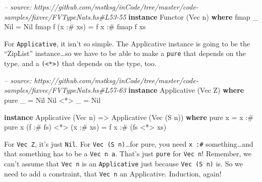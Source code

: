 \documentclass[]{article}
\newenvironment{Shaded}{}{}
\newcommand{\KeywordTok}[1]{\textcolor[rgb]{0.00,0.44,0.13}{\textbf{#1}}}
\newcommand{\DataTypeTok}[1]{\textcolor[rgb]{0.56,0.13,0.00}{#1}}
\newcommand{\CommentTok}[1]{\textcolor[rgb]{0.38,0.63,0.69}{\textit{#1}}}
\newcommand{\OtherTok}[1]{\textcolor[rgb]{0.00,0.44,0.13}{#1}}
\newcommand{\FunctionTok}[1]{\textcolor[rgb]{0.02,0.16,0.49}{#1}}
\newcommand{\NormalTok}[1]{#1}
\begin{document}
\begin{Shaded}
\begin{Highlighting}[]
\CommentTok{-- source: https://github.com/mstksg/inCode/tree/master/code-samples/fixvec/FVTypeNats.hs#L53-55}
\KeywordTok{instance} \DataTypeTok{Functor}\NormalTok{ (}\DataTypeTok{Vec}\NormalTok{ n) }\KeywordTok{where}
\NormalTok{    fmap _ }\DataTypeTok{Nil}       \FunctionTok{=} \DataTypeTok{Nil}
\NormalTok{    fmap f (x }\FunctionTok{:#}\NormalTok{ xs) }\FunctionTok{=}\NormalTok{ f x }\FunctionTok{:#}\NormalTok{ fmap f xs}
\end{Highlighting}
\end{Shaded}

For \texttt{Applicative}, it isn't so simple. The Applicative instance is going
to be the ``ZipList'' instance\ldots{}so we have to be able to make a
\texttt{pure} that depends on the type, and a
\texttt{(\textless{}*\textgreater{})} that depends on the type, too.

\begin{Shaded}
\begin{Highlighting}[]
\CommentTok{-- source: https://github.com/mstksg/inCode/tree/master/code-samples/fixvec/FVTypeNats.hs#L57-63}
\KeywordTok{instance} \DataTypeTok{Applicative}\NormalTok{ (}\DataTypeTok{Vec} \DataTypeTok{Z}\NormalTok{) }\KeywordTok{where}
\NormalTok{    pure _    }\FunctionTok{=} \DataTypeTok{Nil}
    \DataTypeTok{Nil} \FunctionTok{<*>}\NormalTok{ _ }\FunctionTok{=} \DataTypeTok{Nil}

\KeywordTok{instance} \DataTypeTok{Applicative}\NormalTok{ (}\DataTypeTok{Vec}\NormalTok{ n) }\OtherTok{=>} \DataTypeTok{Applicative}\NormalTok{ (}\DataTypeTok{Vec}\NormalTok{ (}\DataTypeTok{S}\NormalTok{ n)) }\KeywordTok{where}
\NormalTok{    pure x }\FunctionTok{=}\NormalTok{ x }\FunctionTok{:#}\NormalTok{ pure x}
\NormalTok{    (f }\FunctionTok{:#}\NormalTok{ fs) }\FunctionTok{<*>}\NormalTok{ (x }\FunctionTok{:#}\NormalTok{ xs) }\FunctionTok{=}\NormalTok{ f x }\FunctionTok{:#}\NormalTok{ (fs }\FunctionTok{<*>}\NormalTok{ xs)}
\end{Highlighting}
\end{Shaded}

For \texttt{Vec\ Z}, it's just \texttt{Nil}. For \texttt{Vec\ (S\ n)}\ldots{}for
pure, you need \texttt{x\ :\#} something\ldots{}and that something has to be a
\texttt{Vec\ n\ a}. That's just \texttt{pure} for \texttt{Vec\ n}! Remember, we
can't assume that \texttt{Vec\ n} is an \texttt{Applicative} just because
\texttt{Vec\ (S\ n)} is. So we need to add a constraint, that \texttt{Vec\ n} an
Applicative. Induction, again!
\end{document}
